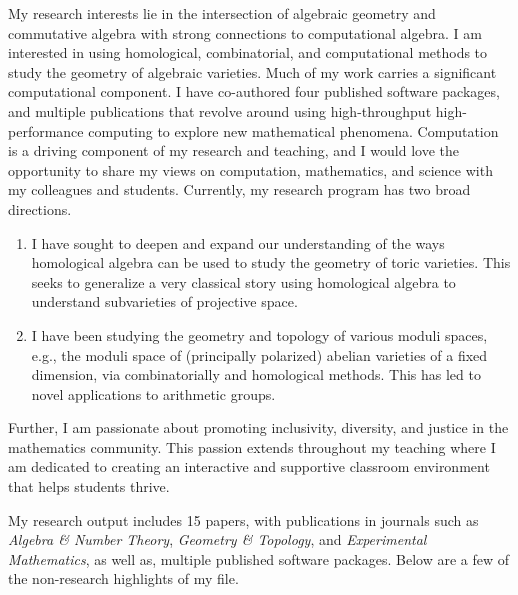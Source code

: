 \documentclass[11pt]{article}
\begin{document}
My research interests lie in the intersection of algebraic geometry and commutative algebra with strong connections to computational algebra. I am interested in using homological, combinatorial, and computational methods to study the geometry of algebraic varieties. Much of my work carries a significant computational component. I have co-authored four published software packages, and multiple publications that revolve around using high-throughput high-performance computing to explore new mathematical phenomena. Computation is a driving component of my research and teaching, and I would love the opportunity to share my views on computation, mathematics, and science with my colleagues and students.  Currently, my research program has two broad directions.
\begin{enumerate}[leftmargin=*,label=(\roman*)]
\item I have sought to deepen and expand our understanding of the ways homological algebra can be used to study the geometry of toric varieties. This seeks to generalize a very classical story using homological algebra to understand subvarieties of projective space.
\item I have been studying the geometry and topology of various moduli spaces, e.g., the moduli space of (principally polarized) abelian varieties of a fixed dimension, via combinatorially and homological methods. This has led to novel applications to arithmetic groups. 
\end{enumerate}
Further, I am passionate about promoting inclusivity, diversity, and justice in the mathematics community. This passion extends throughout my teaching where I am dedicated to creating an interactive and supportive classroom environment that helps students thrive. 

My research output includes 15 papers, with publications in journals such as \textit{Algebra \& Number Theory}, \textit{Geometry \& Topology}, and \textit{Experimental Mathematics}, as well as, multiple published software packages. Below are a few of the non-research highlights of my file.
\end{document}
